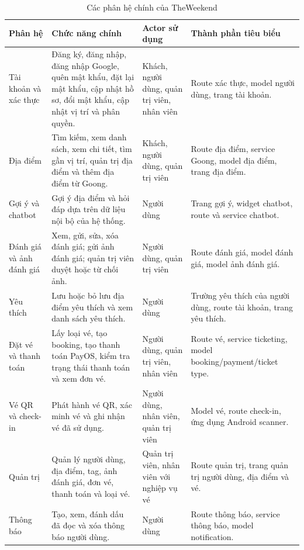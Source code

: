 ﻿\documentclass[../DoAn.tex]{subfiles}
\begin{document}
\begin{table}[H]
\centering
\caption{Các phân hệ chính của TheWeekend}
\label{tab:theweekend-modules}
\scriptsize
\renewcommand{\arraystretch}{1.15}
\setlength{\tabcolsep}{3pt}
\begin{tabularx}{\textwidth}{|L{2.4cm}|Y|L{2.4cm}|L{3.0cm}|}
\hline
\textbf{Phân hệ} & \textbf{Chức năng chính} & \textbf{Actor sử dụng} & \textbf{Thành phần tiêu biểu} \\
\hline
Tài khoản và xác thực & Đăng ký, đăng nhập, đăng nhập Google, quên mật khẩu, đặt lại mật khẩu, cập nhật hồ sơ, đổi mật khẩu, cập nhật vị trí và phân quyền. & Khách, người dùng, quản trị viên, nhân viên & Route xác thực, model người dùng, trang tài khoản. \\
\hline
Địa điểm & Tìm kiếm, xem danh sách, xem chi tiết, tìm gần vị trí, quản trị địa điểm và thêm địa điểm từ Goong. & Khách, người dùng, quản trị viên & Route địa điểm, service Goong, model địa điểm, trang địa điểm. \\
\hline
Gợi ý và chatbot & Gợi ý địa điểm và hỏi đáp dựa trên dữ liệu nội bộ của hệ thống. & Người dùng & Trang gợi ý, widget chatbot, route và service chatbot. \\
\hline
Đánh giá và ảnh đánh giá & Xem, gửi, sửa, xóa đánh giá; gửi ảnh đánh giá; quản trị viên duyệt hoặc từ chối ảnh. & Người dùng, quản trị viên & Route đánh giá, model đánh giá, model ảnh đánh giá. \\
\hline
Yêu thích & Lưu hoặc bỏ lưu địa điểm yêu thích và xem danh sách yêu thích. & Người dùng & Trường yêu thích của người dùng, route tài khoản, trang yêu thích. \\
\hline
Đặt vé và thanh toán & Lấy loại vé, tạo booking, tạo thanh toán PayOS, kiểm tra trạng thái thanh toán và xem đơn vé. & Người dùng, quản trị viên, nhân viên & Route vé, service ticketing, model booking/payment/ticket type. \\
\hline
Vé QR và check-in & Phát hành vé QR, xác minh vé và ghi nhận vé đã sử dụng. & Người dùng, nhân viên, quản trị viên & Model vé, route check-in, ứng dụng Android scanner. \\
\hline
Quản trị & Quản lý người dùng, địa điểm, tag, ảnh đánh giá, đơn vé, thanh toán và loại vé. & Quản trị viên, nhân viên với nghiệp vụ vé & Route quản trị, trang quản trị người dùng, địa điểm và vé. \\
\hline
Thông báo & Tạo, xem, đánh dấu đã đọc và xóa thông báo người dùng. & Người dùng & Route thông báo, service thông báo, model notification. \\
\hline
\end{tabularx}
\end{table}
\end{document}
